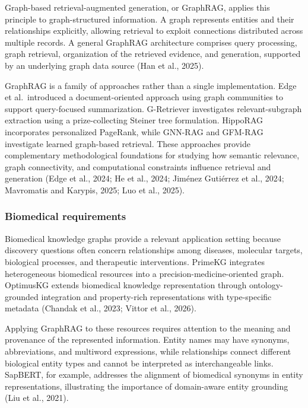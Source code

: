 Graph-based retrieval-augmented generation, or GraphRAG, applies this principle to graph-structured information. A graph represents entities and their relationships explicitly, allowing retrieval to exploit connections distributed across multiple records. A general GraphRAG architecture comprises query processing, graph retrieval, organization of the retrieved evidence, and generation, supported by an underlying graph data source (Han et al., 2025).

GraphRAG is a family of approaches rather than a single implementation. Edge et al.~introduced a document-oriented approach using graph communities to support query-focused summarization. G-Retriever investigates relevant-subgraph extraction using a prize-collecting Steiner tree formulation. HippoRAG incorporates personalized PageRank, while GNN-RAG and GFM-RAG investigate learned graph-based retrieval. These approaches provide complementary methodological foundations for studying how semantic relevance, graph connectivity, and computational constraints influence retrieval and generation (Edge et al., 2024; He et al., 2024; Jiménez Gutiérrez et al., 2024; Mavromatis and Karypis, 2025; Luo et al., 2025).

\subsubsection{Biomedical requirements}\label{biomedical-requirements}

Biomedical knowledge graphs provide a relevant application setting because discovery questions often concern relationships among diseases, molecular targets, biological processes, and therapeutic interventions. PrimeKG integrates heterogeneous biomedical resources into a precision-medicine-oriented graph. OptimusKG extends biomedical knowledge representation through ontology-grounded integration and property-rich representations with type-specific metadata (Chandak et al., 2023; Vittor et al., 2026).

Applying GraphRAG to these resources requires attention to the meaning and provenance of the represented information. Entity names may have synonyms, abbreviations, and multiword expressions, while relationships connect different biological entity types and cannot be interpreted as interchangeable links. SapBERT, for example, addresses the alignment of biomedical synonyms in entity representations, illustrating the importance of domain-aware entity grounding (Liu et al., 2021).

